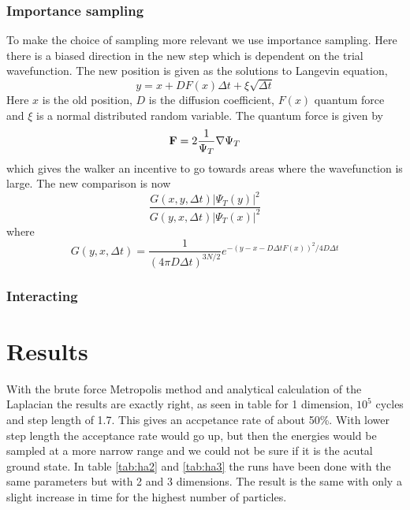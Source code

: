 \documentclass[12pt]{article}
\begin{document}
  \subsubsection{Importance sampling}
  To make the choice of sampling more relevant we use importance sampling.
  Here there is a biased direction in the new step which is dependent on the trial wavefunction.
  The new position is given as the solutions to Langevin equation,
  \begin{equation}
    y = x + DF(x)\Delta t + \xi\sqrt{\Delta t}
  \end{equation}
  Here $x$ is the old position, $D$ is the diffusion coefficient, $F(x)$ quantum force and $\xi$
  is a normal distributed random variable.
  The quantum force is given by 
  \begin{equation}
    {\bf F}= 2\frac{1}{\Psi_T}\nabla\Psi_T
  \end{equation}
  which gives the walker an incentive to go towards areas where the wavefunction is large.
  The new comparison is now
  \begin{equation}
    \frac{G(x,y,\Delta t)|\Psi_T(y)|^2}{G(y,x,\Delta t)|\Psi_T(x)|^2}
  \end{equation}
  where 
  \[ G(y,x,\Delta t) = \frac{1}{(4\pi D\Delta t)^{3N/2}}e^{-(y-x-D\Delta tF(x))^2/4D\Delta t}\]
  \subsubsection{Interacting}

  
  \section{Results}
  
  
  With the brute force Metropolis method and analytical calculation of the Laplacian the
  results are exactly right, as seen in table for 1 dimension, $10^5$ cycles and step length
  of 1.7. This gives an accpetance rate of about 50\%. With lower step length the acceptance
  rate would go up, but then the energies would be sampled at a more narrow range and we could not
  be sure if it is the acutal ground state.
  In table \ref{tab:ha2} and \ref{tab:ha3} the runs have been done with the same parameters but with
  2 and 3 dimensions. The result is the same with only a slight increase in time for the highest
  number of particles.

  
   
  

   
  \newpage
  \appendix
  
\end{document}
